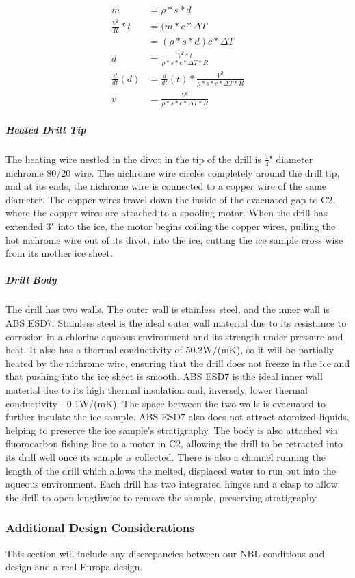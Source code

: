 \documentclass{article}
\begin{document}
\begin{align*}
    m &= \rho * s*d \\
    \frac{V^2}{R}*t &= (m*c*\Delta T \\
    &= (\rho * s*d) c * \Delta T \\
    d &= \frac{V^2 * t}{\rho *s*c*\Delta T*R} \\
    \frac{d}{dt}(d) &= \frac{d}{dt}(t)* \frac{V^2}{\rho *s*c*\Delta T*R} \\
    v &= \frac{V^2}{\rho *s*c*\Delta T*R}
\end{align*}

\subparagraph{Heated Drill Tip}
The heating wire nestled in the divot in the tip of the drill is $\frac{1}{4}$" diameter nichrome 80/20 wire. The nichrome wire circles completely around the drill tip, and at its ends, the nichrome wire is connected to a copper wire of the same diameter. The copper wires travel down the inside of the evacuated gap to C2, where the copper wires are attached to a spooling motor. When the drill has extended 3" into the ice, the motor begins coiling the copper wires, pulling the hot nichrome wire out of its divot, into the ice, cutting the ice sample cross wise from its mother ice sheet.
\subparagraph{Drill Body}
The drill has two walls. The outer wall is stainless steel, and the inner wall is ABS ESD7. Stainless steel is the ideal outer wall material due to its resistance to corrosion in a chlorine aqueous environment and its strength under pressure and heat. It also has a thermal conductivity of 50.2W/(mK), so it will be partially heated by the nichrome wire, ensuring that the drill does not freeze in the ice and that pushing into the ice sheet is smooth. ABS ESD7 is the ideal inner wall material due to its high thermal insulation and, inversely, lower thermal conductivity - 0.1W/(mK). The space between the two walls is evacuated to further insulate the ice sample. ABS ESD7 also does not attract atomized liquids, helping to preserve the ice sample’s stratigraphy. The body is also attached via fluorocarbon fishing line to a motor in C2, allowing the drill to be retracted into its drill well once its sample is collected. There is also a channel running the length of the drill which allows the melted, displaced water to run out into the aqueous environment. Each drill has two integrated hinges and a clasp to allow the drill to open lengthwise to remove the sample, preserving stratigraphy.

\subsubsection{Additional Design Considerations}
This section will include any discrepancies between our NBL conditions and design and a real Europa design.
\end{document}
